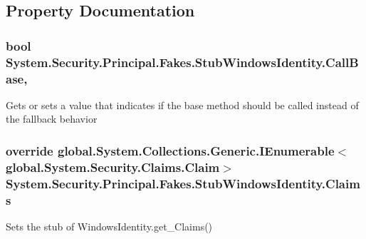 \subsection{Property Documentation}
\hypertarget{class_system_1_1_security_1_1_principal_1_1_fakes_1_1_stub_windows_identity_a4af2932413b1a079df237ef4e213cf8f}{
\subsubsection[{Call\-Base}]{\setlength{\rightskip}{0pt plus 5cm}bool System.\-Security.\-Principal.\-Fakes.\-Stub\-Windows\-Identity.\-Call\-Base\hspace{0.3cm}{\ttfamily [get]}, {\ttfamily [set]}}}\label{class_system_1_1_security_1_1_principal_1_1_fakes_1_1_stub_windows_identity_a4af2932413b1a079df237ef4e213cf8f}


Gets or sets a value that indicates if the base method should be called instead of the fallback behavior

\hypertarget{class_system_1_1_security_1_1_principal_1_1_fakes_1_1_stub_windows_identity_aeac91a167235abeb7c2e54d0f5c497b2}{
\subsubsection[{Claims}]{\setlength{\rightskip}{0pt plus 5cm}override global.\-System.\-Collections.\-Generic.\-I\-Enumerable$<$global.\-System.\-Security.\-Claims.\-Claim$>$ System.\-Security.\-Principal.\-Fakes.\-Stub\-Windows\-Identity.\-Claims\hspace{0.3cm}{\ttfamily [get]}}}\label{class_system_1_1_security_1_1_principal_1_1_fakes_1_1_stub_windows_identity_aeac91a167235abeb7c2e54d0f5c497b2}


Sets the stub of Windows\-Identity.\-get\-\_\-\-Claims()

